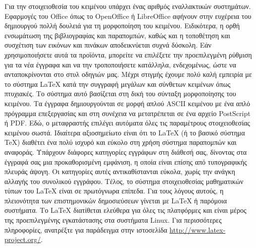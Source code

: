 Για την στοιχειοθεσία του κειμένου υπάρχει ένας αριθμός εναλλακτικών συστημάτων. Εφαρμογές του Office όπως το OpenOffice ή LibreOffice αφήνουν στην ευχέρεια του δημιουργού πολλή δουλειά για τη μορφοποίηση του κειμένου. Ειδικότερα, η ορθή ενσωμάτωση της βιβλιογραφίας και παραπομπών, καθώς και η τοποθέτηση και συσχέτιση των εικόνων και πινάκων αποδεικνύεται συχνά δύσκολη. Εάν χρησιμοποιήσετε αυτά τα προϊόντα, μπορείτε να επιλέξετε την προεπιλεγμένη ρύθμιση για τα νέα έγγραφα και να την τροποποιήσετε κατάλληλα, ενδεχομένως, ώστε να ανταποκρίνονται στο στυλ οδηγιών μας.
Μέχρι στιγμής έχουμε πολύ καλή εμπειρία με το σύστημα \LaTeX{} κατά την συγγραφή μεγάλων και σύνθετων κειμένων όπως πτυχιακές.
Το σύστημα αυτό βασίζεται στη δική του σύνταξη μορφοποίησης του κειμένου. Τα έγγραφα δημιουργούνται σε μορφή απλού ASCII κειμένου με ένα απλό πρόγραμμα επεξεργασίας και στη συνέχεια να μετατρέπεται σε ένα αρχείο PostScript ή PDF.
Εδώ, ο μεταφραστής επιλέγει αυτόματα όλες τις παραμέτρους στοιχειοθεσίας κειμένου σωστά. Ιδιαίτερα αξιοσημείωτο είναι ότι το \LaTeX{} (ή το βασικό σύστημα \TeX{}) διαθέτει ένα πολύ ισχυρό και εύκολο στη χρήση  σύστημα παραπομπών και αναφοράς.
Υπάρχουν διάφορες κατηγορίες εγγράφων στη διάθεσή σας, δίνοντας στα έγγραφά σας μια προκαθορισμένη εμφάνιση, η οποία είναι επίσης από τυπογραφικής πλευράς άψογη. Οι κατηγορίες αυτές αντικαθίστανται εύκολα, χωρίς την ανάγκη αλλαγής του συνολικού εγγράφου. Τέλος, το σύστημα στοιχειοθεσίας μαθηματικών τύπων του LaTeX είναι σε πρωτόγνωρα επίπεδα. Για τους λόγους αυτούς, η πλειονότητα των επιστημονικών δημοσιεύσεων γίνεται με \LaTeX{} ή παρόμοια συστήματα.
Το \LaTeX{} διατίθεται ελεύθερα για όλες τις πλατφόρμες και είναι μέρος της προεπιλεγμένης εγκατάστασης στα συστήματα Linux. Για περισσότερες πληροφορίες, ανατρέξτε για παράδειγμα στην ιστοσελίδα \url{http://www.latex-project.org/}.
